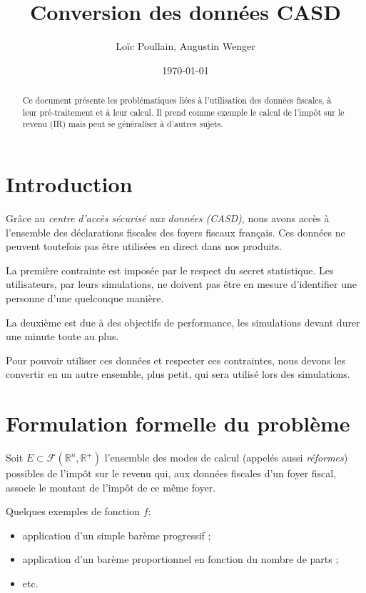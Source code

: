 \documentclass[12pt]{article}
\title{Conversion des données CASD}
\author{Loïc Poullain, Augustin Wenger}
\date{\today}
\begin{document}
\maketitle

\begin{abstract}
Ce document présente les problématiques liées à l'utilisation des données fiscales,
à leur pré-traitement et à leur calcul. Il prend comme exemple le calcul
de l'impôt sur le revenu (IR) mais peut se généraliser à d'autres sujets.
\end{abstract}

\section{Introduction}

Grâce au \emph{centre d'accès sécurisé aux données (CASD)}, nous avons accès à l'ensemble des
déclarations fiscales des foyers fiscaux français. Ces données ne peuvent toutefois pas
être utilisées en direct dans nos produits.

La première contrainte est imposée par le respect du secret statistique. Les utilisateurs,
par leurs simulations, ne doivent pas être en mesure d'identifier une personne d'une
quelconque manière.

La deuxième est due à des objectifs de performance, les simulations devant
durer une minute toute au plus.
\newline

Pour pouvoir utiliser ces données et respecter ces contraintes,
nous devons les convertir en un autre ensemble, plus petit,
qui sera utilisé lors des simulations.

\section{Formulation formelle du problème}

Soit $E \subset \mathcal{F}(\mathbb{R}^n, \mathbb{R}^+)$ l'ensemble des modes de calcul (appelés aussi \emph{réformes})
possibles de l'impôt sur le revenu qui, aux données fiscales d'un foyer fiscal, associe
le montant de l'impôt de ce même foyer.
\newline

Quelques exemples de fonction $f$:
\begin{itemize}
  \item application d'un simple barème progressif ;
  \item application d'un barème proportionnel en fonction du nombre de parts ;
  \item etc.
\end{itemize}
\end{document}
